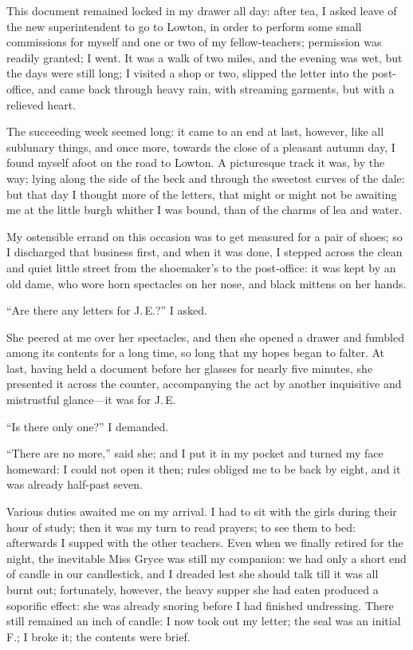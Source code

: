 This document remained locked in my drawer all day: after tea, I asked
leave of the new superintendent to go to Lowton, in order to perform
some small commissions for myself and one or two of my fellow-teachers;
permission was readily granted; I went. It was a walk of two miles, and
the evening was wet, but the days were still long; I visited a shop or
two, slipped the letter into the post-office, and came back through
heavy rain, with streaming garments, but with a relieved heart.

The succeeding week seemed long: it came to an end at last, however,
like all sublunary things, and once more, towards the close of a
pleasant autumn day, I found myself afoot on the road to Lowton. A
picturesque track it was, by the way; lying along the side of the beck
and through the sweetest curves of the dale: but that day I thought more
of the letters, that might or might not be awaiting me at the little
burgh whither I was bound, than of the charms of lea and water.

My ostensible errand on this occasion was to get measured for a pair of
shoes; so I discharged that business first, and when it was done, I
stepped across the clean and quiet little street from the shoemaker's to
the post-office: it was kept by an old dame, who wore horn spectacles on
her nose, and black mittens on her hands.

\enquote{Are there any letters for J.\,E.?} I asked.

She peered at me over her spectacles, and then she opened a drawer and
fumbled among its contents for a long time, so long that my hopes began
to falter. At last, having held a document before her glasses for
nearly five minutes, she presented it across the counter, accompanying
the act by another inquisitive and mistrustful glance---it was for J.\,E\@.

\enquote{Is there only one?} I demanded.

\enquote{There are no more,} said she; and I put it in my pocket and
turned my face homeward: I could not open it then; rules obliged me to
be back by eight, and it was already half-past seven.

Various duties awaited me on my arrival. I had to sit with the girls
during their hour of study; then it was my turn to read prayers; to see
them to bed: afterwards I supped with the other teachers. Even when we
finally retired for the night, the inevitable Miss Gryce was still my
companion: we had only a short end of candle in our candlestick, and I
dreaded lest she should talk till it was all burnt out; fortunately,
however, the heavy supper she had eaten produced a soporific effect: she
was already snoring before I had finished undressing. There still
remained an inch of candle: I now took out my letter; the seal was an
initial F.; I broke it; the contents were brief.

